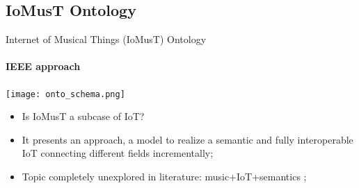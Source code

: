 \documentclass{beamer}
\begin{document}
\subsection{IoMusT Ontology}
\begin{frame}{Internet of Musical Things (IoMusT) Ontology}
\framesubtitle{IEEE approach}
\texttt{[image: onto\_schema.png]}
\begin{itemize}
    \item Is IoMusT a subcase of IoT? 
    \item It presents an approach, a model to realize a semantic and fully interoperable IoT connecting different fields incrementally;
    \item Topic completely unexplored in literature: music+IoT+semantics \cite{turchet2020internet};
\end{itemize}
\end{frame}
\end{document}
